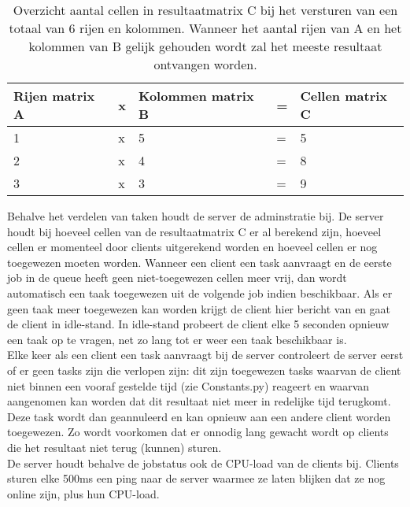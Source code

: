 \documentclass[11pt]{article}
\begin{document}
\begin{table}[H]
    \begin{tabular}{|ll|lll}
    \hline
    Rijen matrix A & x & Kolommen matrix B & = & Cellen matrix C \\ \hline
    1              & x & 5                 & = & 5               \\
    2              & x & 4                 & = & 8               \\
    3              & x & 3                 & = & 9               \\ \hline
    \end{tabular}
    \caption{Overzicht aantal cellen in resultaatmatrix C bij het versturen van een totaal van 6
    rijen en kolommen. Wanneer het aantal rijen van A en het kolommen van B gelijk gehouden wordt
    zal het meeste resultaat ontvangen worden.}
\end{table}

Behalve het verdelen van taken houdt de server de adminstratie bij. De server houdt bij hoeveel
cellen van de resultaatmatrix C er al berekend zijn, hoeveel cellen er momenteel door clients
uitgerekend worden en hoeveel cellen er nog toegewezen moeten worden. Wanneer een client een
task aanvraagt en de eerste job in de queue heeft geen niet-toegewezen cellen meer vrij, dan
wordt automatisch een taak toegewezen uit de volgende job indien beschikbaar. Als er geen taak
meer toegewezen kan worden krijgt de client hier bericht van en gaat de client in idle-stand.
In idle-stand probeert de client elke 5 seconden opnieuw een taak op te vragen, net zo lang tot
er weer een taak beschikbaar is.\\
Elke keer als een client een task aanvraagt bij de server controleert de server eerst of er geen
tasks zijn die verlopen zijn: dit zijn toegewezen tasks waarvan de client niet binnen een vooraf
gestelde tijd (zie Constants.py) reageert en waarvan aangenomen kan worden dat dit resultaat niet
meer in redelijke tijd terugkomt. Deze task wordt dan geannuleerd en kan opnieuw aan een andere
client worden toegewezen. Zo wordt voorkomen dat er onnodig lang gewacht wordt op clients die
het resultaat niet terug (kunnen) sturen.\\
De server houdt behalve de jobstatus ook de CPU-load van de clients bij. Clients sturen elke
500ms een ping naar de server waarmee ze laten blijken dat ze nog online zijn, plus hun CPU-load.
\end{document}
